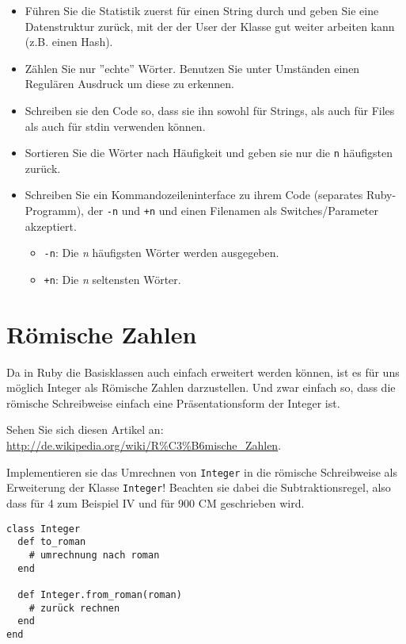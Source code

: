 \documentclass[a4paper,11pt,oneside]{scrbook}
\begin{document}
\begin{itemize}
  \item Führen Sie die Statistik zuerst für einen String durch und geben Sie eine Datenstruktur zurück, mit der der User der Klasse gut weiter arbeiten kann (z.B. einen Hash).
  \item Zählen Sie nur ''echte'' Wörter. Benutzen Sie unter Umständen einen Regulären Ausdruck um diese zu erkennen.
  \item Schreiben sie den Code so, dass sie ihn sowohl für Strings, als auch für Files als auch für stdin verwenden können.
  \item Sortieren Sie die Wörter nach Häufigkeit und geben sie nur die \texttt{n} häufigsten zurück.
  \item Schreiben Sie ein Kommandozeileninterface zu ihrem Code (separates Ruby-Programm), der \texttt{-n} und \texttt{+n} und einen Filenamen als Switches/Parameter akzeptiert.
  \begin{itemize}
    \item \texttt{-n}: Die \emph{n} häufigsten Wörter werden ausgegeben.
    \item \texttt{+n}: Die \emph{n} seltensten Wörter.
  \end{itemize}
  
\end{itemize}




\section{Römische Zahlen} %
\label{sec:römische_zahlen}
Da in Ruby die Basisklassen auch einfach erweitert werden können, ist es für uns möglich Integer als Römische Zahlen darzustellen. Und zwar einfach so, dass die römische Schreibweise einfach eine Präsentationsform der Integer ist.

Sehen Sie sich diesen Artikel an: \url{http://de.wikipedia.org/wiki/R%C3%B6mische_Zahlen}.

Implementieren sie das Umrechnen von \texttt{Integer} in die römische Schreibweise als Erweiterung der Klasse \texttt{Integer}! Beachten sie dabei die Subtraktionsregel, also dass für 4 zum Beispiel IV und für 900 CM geschrieben wird.

\begin{lstlisting}
class Integer
  def to_roman
    # umrechnung nach roman
  end

  def Integer.from_roman(roman)
    # zurück rechnen
  end
end
\end{lstlisting}
\end{document}
